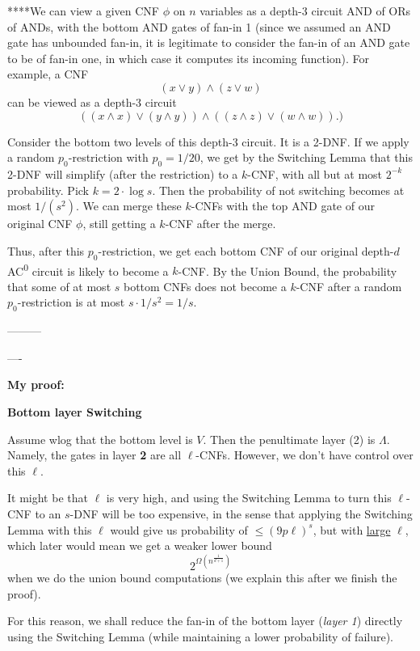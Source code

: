 ****We can view a given CNF $\phi$ on $n$ variables as a depth-3 circuit AND of ORs of ANDs, with the bottom AND gates of fan-in 1 (since we assumed an AND gate has unbounded fan-in, it is legitimate to consider the fan-in of an AND gate to be of fan-in one, in which case it computes its incoming function). For example, a CNF
\[
(x \vee y) \wedge (z \vee w)
\]
can be viewed as a depth-3 circuit
\[
((x \wedge x) \vee (y \wedge y)) \wedge ((z \wedge z) \vee (w \wedge w)).)
\]

Consider the bottom two levels of this depth-3 circuit. It is a 2-DNF. If we apply a random $p_0$-restriction with $p_0 = 1/20$, we get by the Switching Lemma that this 2-DNF will simplify (after the restriction) to a $k$-CNF, with all but at most $2^{-k}$ probability. Pick $k = 2 \cdot \log s$. Then the probability of not switching becomes at most $1/(s^2)$. We can merge these $k$-CNFs with the top AND gate of our original CNF $\phi$, still getting a $k$-CNF after the merge.

Thus, after this $p_0$-restriction, we get each bottom CNF of our original depth-$d$ AC\textsuperscript{0} circuit is likely to become a $k$-CNF. By the Union Bound, the probability that some of at most $s$ bottom CNFs does not become a $k$-CNF after a random $p_0$-restriction is at most $s \cdot 1/s^2 = 1/s$.


---------

\newpage

----


\textbf{My proof:} 

\textbf{Bottom layer Switching} 

Assume wlog that the bottom level is $V$. Then the penultimate layer (2) is $\Lambda$. Namely, the gates in layer \textbf{2} are all $\ell$-CNFs. However, we don’t have control over this $\ell$. 

It might be that $\ell$ is very high, and using the Switching Lemma to turn this $\ell$-CNF to an $s$-DNF will be too expensive, in the sense that applying the Switching Lemma with this $\ell$ would give us probability of $\leq (9p\ell)^s$, but with \underline{large} $\ell$, which later would mean we get a weaker lower bound 
\[
2^{\Omega(n^{\frac{1}{d+1}})}
\]
when we do the union bound computations (we explain this after we finish the proof).



For this reason, we shall reduce the fan-in of the bottom layer (\emph{layer 1}) directly using the Switching Lemma (while maintaining a lower probability of failure).

